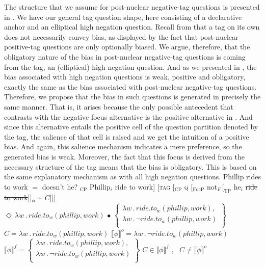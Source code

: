 \documentclass[output=paper,colorlinks,citecolor=brown]{langscibook}
\begin{document}
The structure that we assume for  post-nuclear negative-tag questions is presented in . We have our general tag question shape, here consisting of a declarative anchor and an elliptical high negation question. Recall from  that a tag on its own does not necessarily convey bias, as displayed by the fact that post-nuclear positive-tag questions are only optionally biased. We argue, therefore, that the obligatory nature of the bias in  post-nuclear negative-tag questions is coming from the tag, an (elliptical) high negation question. And as we presented in , the bias associated with high negation questions is weak, positive and obligatory, exactly the same as the bias associated with post-nuclear negative-tag questions. Therefore, we propose that the bias in such questions is generated in precisely the same manner. That is, it arises because the only possible antecedent that contrasts with the negative focus alternative is the positive alternative in . And since this alternative entails the positive cell of the question partition denoted by the tag, the salience of that cell is raised and we get the intuition of a positive bias. And again, this salience mechanism indicates a mere preference, so the generated bias is weak. Moreover, the fact that this focus is derived from the necessary structure of the tag means that the bias is obligatory. This is based on the same explanatory mechanism as with all high negation questions.
\is{}
\ea Phillip rides to work $=$ doesn't he?\label{Neg.PNu.Anyls}
    \ea {[[}$_{\text{CP}}$ Phillip$_i$ ride to work] [\textsc{tag} {[}$_{\text{CP}}$ \textsc{q} [$_{\text{FocP}}$ not$_{F} \, [_{\text{TP}}$ he$_i$ \sout{ride to work}]]$_{\phi} \sim C$]]]\label{Neg.PNu.LF}
    \ex $\Diamond \, \lambda w \, . \, ride.to_w(phillip,work) \, \bullet \, 
            \left\{ \begin{array}{l}
            \lambda w \, . \, ride.to_w(phillip,work), \\ 
            \lambda w \, . \,\neg ride.to_w(phillip,work) \\ 
            \end{array} \right\}$
    \ex $C = \lambda w \, . \, ride.to_w(phillip,work)$\label{Neg.PNu.C}
    \ex $\llbracket \phi \rrbracket^{o} = \lambda w \, . \,\neg ride.to_w(phillip,work)$\label{Neg.PNu.phi}
    \ex $\llbracket \phi \rrbracket^{f} = \left\{ \begin{array}{l}
            \lambda w \, . \, ride.to_w(phillip,work), \\ 
            \lambda w \, . \,\neg ride.to_w(phillip,work) \\ 
            \end{array} \right\}  $
    \ex $C \in  \llbracket \phi \rrbracket ^f$ \cmark, \, $C \ne \llbracket \phi  \rrbracket ^o$ \cmark
    \z
\z
\il{}
\end{document}

